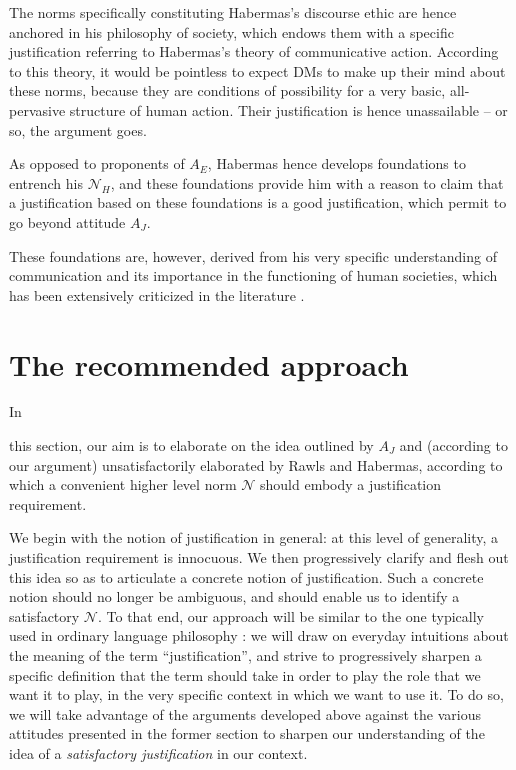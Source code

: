 \documentclass[preprint, french, english, 11pt, authoryear]{elsarticle}%
\newcommand{\adv}{\mathscr{N}}
\begin{document}
\begin{changebar}
The norms specifically constituting Habermas's discourse ethic are hence anchored in his philosophy of society, which endows them with a specific justification referring to Habermas's theory of communicative action.
According to this theory, it would be pointless to expect \acp{DM} to make up their mind about these norms, because 
they are conditions of possibility for a very basic, all-pervasive structure of human action. Their justification is hence unassailable -- or so, the argument goes.

As opposed to proponents of $A_E$, Habermas hence develops foundations to entrench his $\mathscr{N}_{H}$, and these foundations provide him with a reason to claim that a justification based on these foundations is a good justification, which permit to go beyond attitude $A_J$. \end{changebar}
These foundations are, however, derived from his very specific understanding of communication and its importance in the functioning of human societies, which has been extensively criticized in the literature \citep{heath_communicative_2001,honneth_kritik_1985,benhabib_situating_1992}. 


\section{The recommended approach}
\label{sec:recomm}

In \begin{changebar}this section, our aim is to elaborate on the idea outlined by $A_J$ and (according to our argument) unsatisfactorily elaborated by Rawls and Habermas, according to which a convenient higher level norm $\adv$ should embody a justification requirement.\end{changebar}

We begin with the notion of justification in general: at this level of generality, a justification requirement is innocuous. 
We then progressively clarify and flesh out this idea so as to articulate a concrete notion of justification. Such a concrete notion should no longer be ambiguous, and should enable us to identify a satisfactory $\adv$. 
To that end, our approach will be similar to the one typically used in ordinary language philosophy \citep{soames_philosophical_2003}: 
we will draw on everyday intuitions about the meaning of the term ``justification'', and strive to progressively sharpen a specific definition that the term should take in order to play the role that we want it to play, in the very specific context in which we want to use it. 
To do so, we will take advantage of the arguments developed above against the various attitudes presented in the former section to sharpen our understanding of the idea of a \emph{satisfactory justification} in our context.
\end{document}

